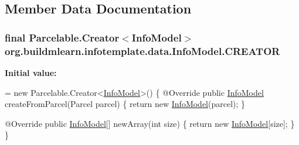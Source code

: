 \subsection{Member Data Documentation}
\subsubsection[{\texorpdfstring{C\+R\+E\+A\+T\+OR}{CREATOR}}]{\setlength{\rightskip}{0pt plus 5cm}final Parcelable.\+Creator$<${\bf Info\+Model}$>$ org.\+buildmlearn.\+infotemplate.\+data.\+Info\+Model.\+C\+R\+E\+A\+T\+OR}\hypertarget{classorg_1_1buildmlearn_1_1infotemplate_1_1data_1_1InfoModel_ae35b754656daaf2d9f2465dd7583a9f6}{}\label{classorg_1_1buildmlearn_1_1infotemplate_1_1data_1_1InfoModel_ae35b754656daaf2d9f2465dd7583a9f6}
{\bfseries Initial value\+:}
\begin{DoxyCode}
= \textcolor{keyword}{new} Parcelable.Creator<\hyperlink{classorg_1_1buildmlearn_1_1infotemplate_1_1data_1_1InfoModel_a650d1dec766121f89f9877ad2e575deb}{InfoModel}>() \{
        @Override
        \textcolor{keyword}{public} \hyperlink{classorg_1_1buildmlearn_1_1infotemplate_1_1data_1_1InfoModel_a650d1dec766121f89f9877ad2e575deb}{InfoModel} createFromParcel(Parcel parcel) \{
            \textcolor{keywordflow}{return} \textcolor{keyword}{new} \hyperlink{classorg_1_1buildmlearn_1_1infotemplate_1_1data_1_1InfoModel_a650d1dec766121f89f9877ad2e575deb}{InfoModel}(parcel);
        \}

        @Override
        \textcolor{keyword}{public} \hyperlink{classorg_1_1buildmlearn_1_1infotemplate_1_1data_1_1InfoModel_a650d1dec766121f89f9877ad2e575deb}{InfoModel}[] newArray(\textcolor{keywordtype}{int} size) \{
            \textcolor{keywordflow}{return} \textcolor{keyword}{new} \hyperlink{classorg_1_1buildmlearn_1_1infotemplate_1_1data_1_1InfoModel_a650d1dec766121f89f9877ad2e575deb}{InfoModel}[size];
        \}
    \}
\end{DoxyCode}
